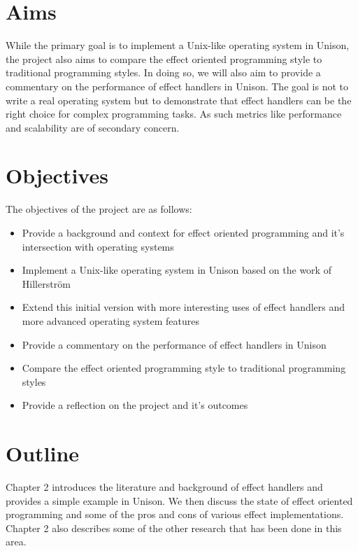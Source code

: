 \documentclass[logo,bsc,singlespacing,parskip]{infthesis}
\begin{document}
\section{Aims}

While the primary goal is to implement a Unix-like operating system in Unison,
the project also aims to compare the effect oriented programming style to
traditional programming styles. In doing so, we will also aim to provide a
commentary on the performance of effect handlers in Unison. The goal is not to
write a real operating system but to demonstrate that effect handlers can be
the right choice for complex programming tasks. As such metrics like
performance and scalability are of secondary concern.

\section{Objectives}

The objectives of the project are as follows:

\begin{itemize}
  \item{Provide a background and context for effect oriented programming and it's intersection with operating systems}
  \item{Implement a Unix-like operating system in Unison based on the work of Hillerstr\"{o}m \cite{hillerstrom2022foundations}}
  \item{Extend this initial version with more interesting uses of effect handlers and more advanced operating system features}
  \item{Provide a commentary on the performance of effect handlers in Unison}
  \item{Compare the effect oriented programming style to traditional programming styles}
  \item{Provide a reflection on the project and it's outcomes}
\end{itemize}

\section{Outline}

Chapter 2 introduces the literature and background of effect handlers and
provides a simple example in Unison. We then discuss the state of effect
oriented programming and some of the pros and cons of various effect
implementations. Chapter 2 also describes some of the other research that has
been done in this area.
\end{document}
